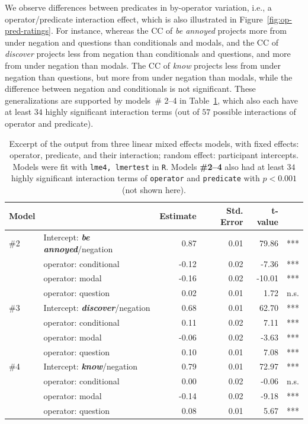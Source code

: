 \documentclass[a4paper,12pt,twoside]{article}
\begin{document}
			We observe differences between predicates in by-operator variation, i.e., a operator/predicate interaction effect, which is also illustrated in Figure~\ref{fig:op-pred-ratings}.
			For instance, whereas the CC of \emph{be annoyed} projects more from under negation and questions than conditionals and modals, and the CC of \emph{discover} projects less from negation than conditionals and questions, and more from under negation than modals. The CC of \emph{know} projects less from under negation than questions, but more from under negation than modals, while the difference between negation and conditionals is not significant.
			These generalizations are supported by models\ \# 2--4 in Table\ \ref{t:models}, which also each have at least $34$ highly significant interaction terms (out of $57$ possible interactions of operator and predicate).

			\begin{table}[ht]
				\centering
				\begin{tabular}{llrrrr}
					Model & & Estimate & Std. Error & t-value\\
					\midrule
					\#2 & Intercept: \emph{\bf be annoyed}/negation & 0.87 & 0.01 & 79.86 & ***\\
					& operator: conditional & -0.12 & 0.02  & -7.36 & ***\\
					& operator: modal & -0.16 & 0.02  & -10.01 & ***\\
					& operator: question & 0.02 & 0.01 & 1.72 & n.s.\\
					\midrule
					\#3 & Intercept: \emph{\bf discover}/negation & 0.68 & 0.01 & 62.70 & ***\\
					& operator: conditional & 0.11 & 0.02 & 7.11 & ***\\
					& operator: modal & -0.06 & 0.02 & -3.63 & ***\\
					& operator: question & 0.10 & 0.01 & 7.08 & ***\\
					\midrule
					\#4 & Intercept: \emph{\bf know}/negation & 0.79 & 0.01 & 72.97 & ***\\
					& operator: conditional & 0.00 & 0.02 & -0.06 & n.s.\\
					& operator: modal & -0.14 & 0.02 & -9.18 & ***\\
					& operator: question & 0.08 & 0.01 & 5.67 & ***\\
					\bottomrule
				\end{tabular}
				\caption{\small Excerpt of the output from three linear mixed effects models, with fixed effects: operator, predicate, and their interaction; random effect: participant intercepts.
				Models were fit with \texttt{lme4, lmertest} in \texttt{R}. Models \textbf{\#2--4} also had at least $34$ highly significant interaction terms of \texttt{operator} and \texttt{predicate} with $p < 0.001$ (not shown here).\label{t:models}}
			\end{table}
\end{document}
